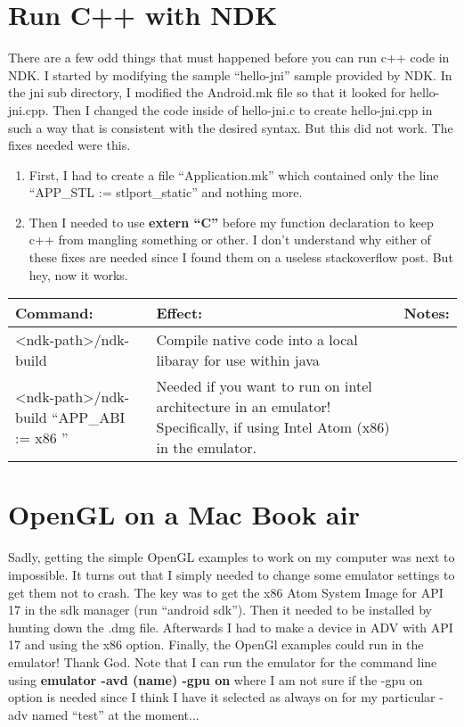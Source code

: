 \documentclass[english]{article}
\begin{document}
\section*{Run C++ with NDK}
There are a few odd things that must happened before you can run c++ code in NDK. I started by modifying the sample ``hello-jni'' sample provided by NDK. In the jni sub directory, I modified the Android.mk file so that it looked for hello-jni.cpp. Then I changed the code inside of hello-jni.c to create hello-jni.cpp in such a way that is consistent with the desired syntax.  But this did not work.  The fixes needed were this.
\begin{enumerate}
\item
  First, I had to create a file ``Application.mk'' which contained only the line ``APP\_STL := stlport\_static'' and nothing more. 
\item
Then I needed to use \textbf{extern ``C''} before my function declaration to keep c++ from mangling something or other. I don't understand why either of these fixes are needed since I found them on a useless stackoverflow post.  But hey, now it works.
\end{enumerate}

\begin{tabular}{|p{2cm}|p{8cm}|p{5cm}|}
\hline 
Command: & Effect: & Notes: \\
\hline 
\hline
<ndk-path>/ndk-build & Compile native code into a local libaray for use within java & \\
\hline
<ndk-path>/ndk-build ``APP\_ABI := x86 '' & Needed if you want to run on intel architecture in an emulator!  Specifically, if using Intel Atom (x86) in the emulator. & \\
\hline 
\end{tabular}


\section*{OpenGL on a Mac Book air}
Sadly, getting the simple OpenGL examples to work on my computer was next to impossible. It turns out that I simply needed to change some emulator settings to get them not to crash. The key was to get the x86 Atom System Image for API 17 in the sdk manager (run ``android sdk''). Then it needed to be installed by hunting down the .dmg file. Afterwards I had to make a device in ADV with API 17 and using the x86 option. Finally, the OpenGl examples could run in the emulator!  Thank God. Note that I can run the emulator for the command line using \textbf{emulator -avd (name) -gpu on} where I am not sure if the -gpu on option is needed since I think I have it selected as always on for my particular -adv named ``test'' at the moment...
\end{document}
